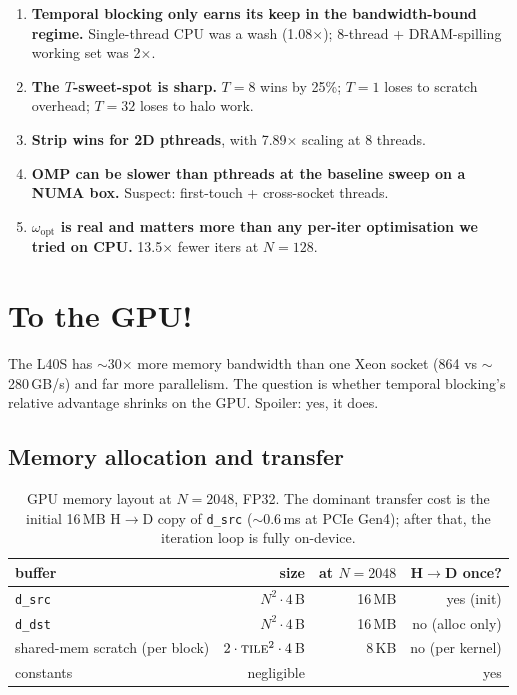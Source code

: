 \documentclass[11pt]{article}
\begin{document}
\begin{enumerate}[leftmargin=1.4em,itemsep=2pt,topsep=2pt]
  \item \textbf{Temporal blocking only earns its keep in the
        bandwidth-bound regime.} Single-thread CPU was a wash
        (1.08$\times$); 8-thread + DRAM-spilling working set was
        2$\times$.
  \item \textbf{The $T$-sweet-spot is sharp.} $T{=}8$ wins by 25\%;
        $T{=}1$ loses to scratch overhead; $T{=}32$ loses to halo
        work.
  \item \textbf{Strip wins for 2D pthreads}, with 7.89$\times$
        scaling at 8 threads.
  \item \textbf{OMP can be slower than pthreads at the baseline
        sweep on a NUMA box.} Suspect: first-touch + cross-socket
        threads.
  \item \textbf{$\omega_{\text{opt}}$ is real and matters more than
        any per-iter optimisation we tried on CPU.} 13.5$\times$
        fewer iters at $N{=}128$.
\end{enumerate}

\section{To the GPU!}
\label{sec:gpu}

The L40S has $\sim$30$\times$ more memory bandwidth than one Xeon
socket (864 vs $\sim$280\,GB/s) and far more parallelism. The
question is whether temporal blocking's relative advantage shrinks on
the GPU. Spoiler: yes, it does.

\subsection{Memory allocation and transfer}

\begin{table}[h!]
\centering
\renewcommand{\arraystretch}{1.1}
\begin{tabular}{lrrr}
\toprule
\textbf{buffer} & \textbf{size} & \textbf{at $N{=}2048$} & \textbf{H$\to$D once?} \\
\midrule
\texttt{d\_src}                 & $N^2 \cdot 4$\,B   & 16\,MB & yes (init) \\
\texttt{d\_dst}                 & $N^2 \cdot 4$\,B   & 16\,MB & no (alloc only) \\
shared-mem scratch (per block)  & $2\cdot\textsc{tile}^2 \cdot 4$\,B & 8\,KB & no (per kernel) \\
constants                       & negligible    &        & yes \\
\bottomrule
\end{tabular}
\caption{GPU memory layout at $N{=}2048$, FP32. The dominant transfer
cost is the initial 16\,MB H$\to$D copy of \texttt{d\_src} ($\sim$0.6\,ms
at PCIe Gen4); after that, the iteration loop is fully on-device.}
\label{tab:gpu-mem}
\end{table}
\end{document}
